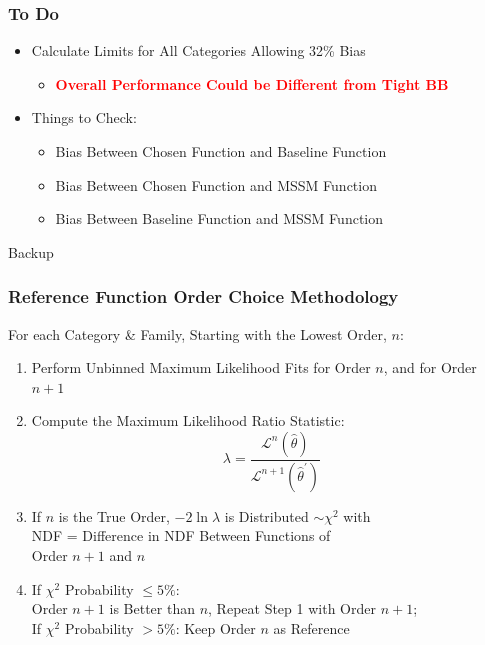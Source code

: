 \documentclass{beamer}
\newcommand{\tredbf}[1]{\textcolor{red}{\bf #1}}
\begin{document}
\begin{frame}
\frametitle{To Do}
  \begin{itemize}
  \item Calculate Limits for All Categories Allowing 32\% Bias
    \begin{itemize}
      \item \tredbf{Overall Performance Could be Different from Tight BB}
    \end{itemize}
  \item Things to Check:
    \begin{itemize}
      \item Bias Between Chosen Function and Baseline Function
      \item Bias Between Chosen Function and MSSM Function
      \item Bias Between Baseline Function and MSSM Function
    \end{itemize}
  \end{itemize}
\begin{center}
\end{center}
\end{frame}

\begin{frame}
  \begin{center}
    \Huge
    Backup
  \end{center}
\end{frame}


\begin{frame}[label=refSelectionMethod]
\frametitle{Reference Function Order Choice Methodology}
  For each Category \& Family, Starting with the Lowest Order, $n$:
\small
  \begin{enumerate}
    \item Perform Unbinned Maximum Likelihood Fits for Order $n$, and for Order $n+1$
    \item Compute the Maximum Likelihood Ratio Statistic:
    \[ \lambda = \frac{\mathcal{L}^{n}(\hat{\theta})}{\mathcal{L}^{n+1}( \hat{\theta}^{'} )}\]
    \item If $n$ is the True Order, $-2\ln\lambda$ is Distributed $\sim \chi^2$ with \\ NDF = Difference in NDF Between Functions of \\ Order $n+1$ and $n$
    \item If $\chi^2$ Probability $\leq5\%$: 
        \\Order $n+1$ is Better than $n$, Repeat Step 1 with Order $n+1$;
        \\ If $\chi^2$ Probability $>5\%$: Keep Order $n$ as Reference
  \end{enumerate}
\end{frame}
\end{document}
